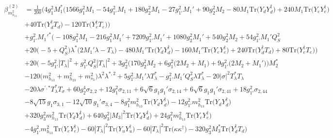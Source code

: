 {\begin{align}
\beta_{m_{h_{13}}^2}^{(2)} & =  
\frac{1}{200} \Big(4 g_{1}^{2} M_1^* \Big(1566 g_{1}^{2} M_1 -54 g_{1'}^{2} M_1 +180 g_{2}^{2} M_1 -27 g_{1'}^{2} M_1' +90 g_{2}^{2} M_2 -80 M_1 \mbox{Tr}\Big({Y_d  Y_{d}^{\dagger}}\Big) +240 M_1 \mbox{Tr}\Big({Y_e  Y_{e}^{\dagger}}\Big) \nonumber \\ 
 &+40 \mbox{Tr}\Big({Y_{d}^{\dagger}  T_d}\Big) -120 \mbox{Tr}\Big({Y_{e}^{\dagger}  T_e}\Big) \Big)\nonumber \\ 
 &+g_{1'}^{2} M_1'^* \Big(-108 g_{1}^{2} M_1 -216 g_{1}^{2} M_1' +7209 g_{1'}^{2} M_1' +1080 g_{2}^{2} M_1' +540 g_{2}^{2} M_2 +54 g_{1'}^{2} M_1' Q_{S}^{2} \nonumber \\ 
 &+20 \Big(-5 + Q_{S}^{2}\Big)\lambda^* \Big(2 M_1' \lambda  - T_{\lambda} \Big)-480 M_1' \mbox{Tr}\Big({Y_d  Y_{d}^{\dagger}}\Big) -160 M_1' \mbox{Tr}\Big({Y_e  Y_{e}^{\dagger}}\Big) +240 \mbox{Tr}\Big({Y_{d}^{\dagger}  T_d}\Big) +80 \mbox{Tr}\Big({Y_{e}^{\dagger}  T_e}\Big) \Big)\nonumber \\ 
 &+20 \Big(-5 g_{1'}^{2} |T_{\lambda}|^2 +g_{1'}^{2} Q_{S}^{2} |T_{\lambda}|^2 +3 g_{2}^{2} \Big(170 g_{2}^{2} M_2  + 6 g_{1}^{2} \Big(2 M_2  + M_1\Big) + 9 g_{1'}^{2} \Big(2 M_2  + M_1'\Big)\Big)M_2^* \nonumber \\ 
 &-120 \Big(m_{h_{13}}^2 + m_{h_{23}}^2 + m_{s_3}^2\Big)\lambda^{2} \lambda^{*,2} +5 g_{1'}^{2} M_1' \lambda T_{\lambda}^* - g_{1'}^{2} M_1' Q_{S}^{2} \lambda T_{\lambda}^* -20 |\sigma|^2 T_{\lambda}^* T_{\lambda} \nonumber \\ 
 &-20 \lambda \sigma^{\prime,*} T_{\lambda}^* T_{\sigma} +60 g_{2}^{4} \sigma_{2,2} +12 g_{1}^{2} \sigma_{2,11} +6 \sqrt{6} g_1 g_1' \sigma_{2,14} +6 \sqrt{6} g_1 g_1' \sigma_{2,41} +18 g_{1'}^{2} \sigma_{2,44} \nonumber \\ 
 &-8 \sqrt{15} g_1 \sigma_{3,1} -12 \sqrt{10} g_1' \sigma_{3,4} -8 g_{1}^{2} m_{h_{13}}^2 \mbox{Tr}\Big({Y_d  Y_{d}^{\dagger}}\Big) -12 g_{1'}^{2} m_{h_{13}}^2 \mbox{Tr}\Big({Y_d  Y_{d}^{\dagger}}\Big) \nonumber \\ 
 &+320 g_{3}^{2} m_{h_{13}}^2 \mbox{Tr}\Big({Y_d  Y_{d}^{\dagger}}\Big) +640 g_{3}^{2} |M_3|^2 \mbox{Tr}\Big({Y_d  Y_{d}^{\dagger}}\Big) +24 g_{1}^{2} m_{h_{13}}^2 \mbox{Tr}\Big({Y_e  Y_{e}^{\dagger}}\Big) \nonumber \\ 
 &-4 g_{1'}^{2} m_{h_{13}}^2 \mbox{Tr}\Big({Y_e  Y_{e}^{\dagger}}\Big) -60 |T_{\lambda}|^2 \mbox{Tr}\Big({Y_u  Y_{u}^{\dagger}}\Big) -60 |T_{\lambda}|^2 \mbox{Tr}\Big({\kappa  \kappa^{\dagger}}\Big) -320 g_{3}^{2} M_3^* \mbox{Tr}\Big({Y_{d}^{\dagger}  T_d}\Big) \nonumber \\ 

\end{align}}
